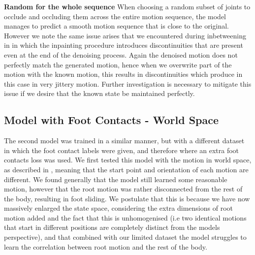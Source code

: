 \textbf{Random for the whole sequence}
When choosing a random subset of joints to occlude and occluding them across the entire motion sequence, the model manages to predict a smooth motion sequence that is close to the original. However we note the same issue arises that we encountered during inbetweening in  in which the inpainting procedure introduces discontinuities that are present even at the end of the denoising process. Again the denoised motion does not perfectly match the generated motion, hence when we overwrite part of the motion with the known motion, this results in discontinuities which produce in this case in very jittery motion. Further investigation is necessary to mitigate this issue if we desire that the known state be maintained perfectly.

\subsection{Model with Foot Contacts - World Space}
\label{sec:diffusion_contacts_world_space}

The second model was trained in a similar manner, but with a different dataset in which the foot contact labels were given, and therefore where an extra foot contacts loss was used. We first tested this model with the motion in world space, as described in , meaning that the start point and orientation of each motion are different. We found generally that the model still learned some reasonable motion, however that the root motion was rather disconnected from the rest of the body, resulting in foot sliding. We postulate that this is because we have now massively enlarged the state space, considering the extra dimensions of root motion added and the fact that this is unhomogenised (i.e two identical motions that start in different positions are completely distinct from the models perspective), and that combined with our limited dataset the model struggles to learn the correlation between root motion and the rest of the body.


